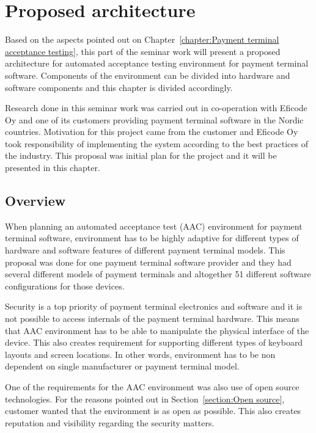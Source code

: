 
\chapter{Proposed architecture}
\label{chapter:Proposed architecture}

Based on the aspects pointed out on Chapter~\ref{chapter:Payment terminal acceptance testing}, this part of the seminar work will present a proposed architecture for automated acceptance testing environment for payment terminal software. Components of the environment can be divided into hardware and software components and this chapter is divided accordingly.

Research done in this seminar work was carried out in co-operation with Eficode Oy and one of its customers providing payment terminal software in the Nordic countries. Motivation for this project came from the customer and Eficode Oy took responsibility of implementing the system according to the best practices of the industry. This proposal was initial plan for the project and it will be presented in this chapter.

\section{Overview}

When planning an automated acceptance test (AAC) environment for payment terminal software, environment has to be highly adaptive for different types of hardware and software features of different payment terminal models. This proposal was done for one payment terminal software provider and they had several different models of payment terminals and altogether 51 different software configurations for those devices.

Security is a top priority of payment terminal electronics and software and it is not possible to access internals of the payment terminal hardware. This means that AAC environment has to be able to manipulate the physical interface of the device. This also creates requirement for supporting different types of keyboard layouts and screen locations. In other words, environment has to be non dependent on single manufacturer or payment terminal model.

One of the requirements for the AAC environment was also use of open source technologies. For the reasons pointed out in Section~\ref{section:Open source}, customer wanted that the environment is as open as possible. This also creates reputation and visibility regarding the security matters.

